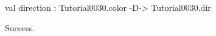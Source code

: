 \chklistingtrue
{}
\begin{ChkListingMsg}
val direction : Tutorial0030.color -D-> Tutorial0030.dir
\end{ChkListingMsg}
\begin{ChkListingErr}
Success.
\end{ChkListingErr}
